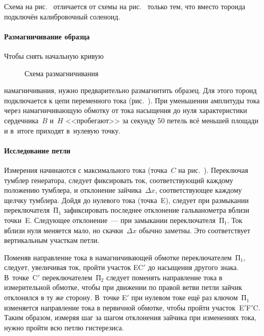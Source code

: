 Схема на рис.~ отличается от схемы на
рис.~ только тем, что вместо тороида
подключён калибровочный соленоид.

%



\paragraph{Размагничивание образца}
Чтобы снять начальную кривую 
\begin{wrapfigure}[8]{r}{0.5\textwidth}
    \centering
    \caption{Схема размагничивания}
\end{wrapfigure}
намагничивания, нужно предварительно 
размагнитить образец.
Для этого тороид подключается к цепи переменного тока
(рис.~). При уменьшении амплитуды тока через
намагничивающую обмотку от тока насыщения до нуля характеристики сердечника~$B$
и~$H$ <<пробегают>> за секунду 50 петель всё меньшей площади и в~итоге
приходят в~нулевую точку.



\paragraph{Исследование петли}
Измерения начинаются с максимального тока (точка~$C$ на рис.~). Переключая тумблер генератора,
следует фиксировать ток, соответствующий каждому положению тумблера, и
отклонение зайчика~$\Delta x$, соответствующее
каждому щелчку тумблера. Дойдя до нулевого тока
(точка~E), следует при размыкании переключателя~$\text{П}_1$ 
зафиксировать последнее отклонение гальванометра вблизи точки~E. Следующее
отклонение~--- при замыкании переключателя~$\text{П}_1$. 
Ток вблизи нуля меняется мало, но скачки~$\Delta x$ обычно заметны. 
Это соответствует вертикальным участкам петли.

Поменяв направление тока в намагничивающей обмотке переключателем~$\text{П}_1$,
следует, увеличивая ток, пройти участок EC$'$ до
насыщения другого знака. В~точке~C$'$ переключателем~$\text{П}_2$ следует
поменять направление тока в измерительной обмотке, чтобы при
движении по правой ветви петли зайчик отклонялся в ту же сторону. 
В~точке E$'$ при нулевом токе ещё раз ключом~$\text{П}_1$
изменяется направление тока в первичной обмотке, чтобы пройти участок~E$'$F$'$C.
Таким образом, измеряя шаг за шагом отклонения зайчика при изменениях тока, 
нужно пройти всю петлю гистерезиса.

